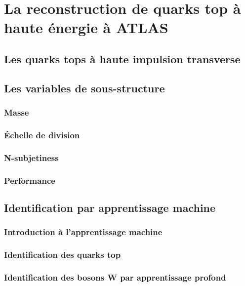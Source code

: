 \singlespacing{}
\chapter{La reconstruction de quarks top à haute énergie à ATLAS}
\label{sec:top}
\doublespacing{}

\section{Les quarks tops à haute impulsion transverse}
\label{sec:top:boosted}

\section{Les variables de sous-structure}
\label{sec:top:sous_structure}

\subsection{Masse}
\label{sec:top:sous_structure:masse}

\subsection{Échelle de division}
\label{sec:top:sous_structure:d_ij}

\subsection{N-subjetiness}
\label{sec:top:sous_structure:tau_ij}

\subsection{Performance}
\label{sec:top:sous_structure:perf}

\section{Identification par apprentissage machine}
\label{sec:top:ml}

\subsection{Introduction à l'apprentissage machine}
\label{sec:top:ml:intro}

\subsection{Identification des quarks top}
\label{sec:top:ml:top}

\subsection{Identification des bosons W par apprentissage profond}
\label{sec:top:ml:w}

